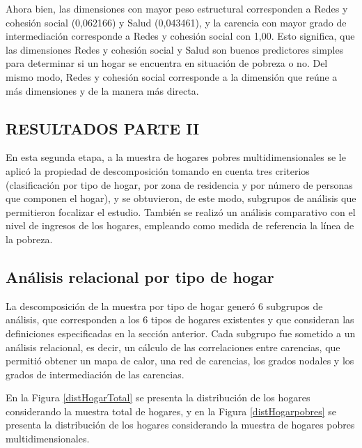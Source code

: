 \documentclass[12pt,letterpaper,spanish]{article}
\begin{document}
\begin{enumerate}
Ahora bien, las dimensiones con mayor peso estructural corresponden a Redes y cohesión social (0,062166) y Salud (0,043461), y la carencia con mayor grado de intermediación corresponde a Redes y cohesión social con 1,00. Esto significa, que las dimensiones Redes y cohesión social y Salud son buenos predictores simples para determinar si un hogar se encuentra en situación de pobreza o no. Del mismo modo, Redes y cohesión social corresponde a la dimensión que reúne a más dimensiones y de la manera más directa.

\end{enumerate}


\subsection{RESULTADOS PARTE II}
En esta segunda etapa, a la muestra de hogares pobres multidimensionales se le aplicó la propiedad de descomposición tomando en cuenta tres criterios (clasificación por tipo de hogar, por zona de residencia y por número de personas que componen el hogar), y se obtuvieron, de este modo, subgrupos de análisis que permitieron focalizar el estudio. También se realizó un análisis comparativo con el nivel de ingresos de los hogares, empleando como medida de referencia la línea de la pobreza.


\subsection{Análisis relacional por tipo de hogar}
La descomposición de la muestra por tipo de hogar generó 6 subgrupos de análisis, que corresponden a los 6 tipos de hogares existentes y que consideran las definiciones especificadas en la sección anterior. Cada subgrupo fue sometido a un análisis relacional, es decir, un cálculo de las correlaciones entre carencias, que permitió obtener un mapa de calor, una red de carencias, los grados nodales y los grados de intermediación de las carencias. 

En la Figura \ref{distHogarTotal} se presenta la distribución de los hogares considerando la muestra total de hogares, y en la Figura \ref{distHogarpobres} se presenta la distribución de los hogares considerando la muestra de hogares pobres multidimensionales. 
\end{document}
